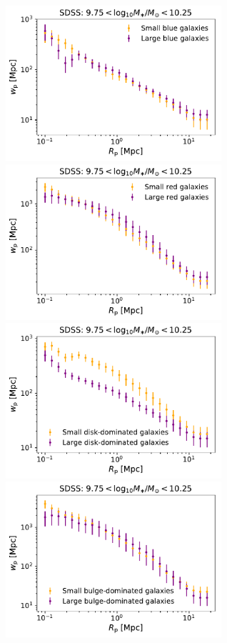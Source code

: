 \documentclass[usenatbib,usegraphicx,letterpaper]{mn2e}
\begin{document}
\begin{figure}
\centering
\includegraphics[width=8cm]{FIGS/blue_sdss_size_dependent_clustering_9p75_to_10p25.pdf}
\includegraphics[width=8cm]{FIGS/red_sdss_size_dependent_clustering_9p75_to_10p25.pdf}
\includegraphics[width=8cm]{FIGS/disk_sdss_size_dependent_clustering_9p75_to_10p25.pdf}
\includegraphics[width=8cm]{FIGS/bulge_sdss_size_dependent_clustering_9p75_to_10p25.pdf}

\end{figure}
\end{document}
